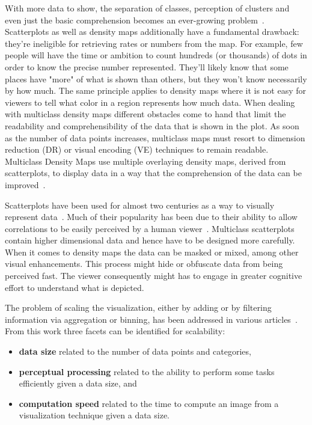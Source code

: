 With more data to show, the separation of classes, perception of clusters and even just the basic comprehension becomes an ever-growing problem~\cite{jo2019declarative}. Scatterplots as well as density maps additionally have a fundamental drawback: they're ineligible for retrieving rates or numbers from the map. For example, few people will have the time or ambition to count hundreds (or thousands) of dots in order to know the precise number represented. They'll likely know that some places have "more" of what is shown than others, but they won't know necessarily by how much. The same principle applies to density maps where it is not easy for viewers to tell what color in a region represents how much data.
When dealing with multiclass density maps different obstacles come to hand that limit the readability and comprehensibility of the data that is shown in the plot.
As soon as the number of data points increases, multiclass maps must resort to dimension reduction (DR) or visual encoding (VE) techniques to remain readable. Multiclass Density Maps use multiple overlaying density maps, derived from scatterplots, to display data in a way that the comprehension of the data can be improved~\cite{jo2019declarative}.

Scatterplots have been used for almost two centuries as a way to visually represent data~\cite{friendly2005early}. Much of their popularity has been due to their ability to allow correlations to be easily perceived by a human viewer~\cite{cleveland1993visualizing, harris2000information}. Multiclass scatterplots contain higher dimensional data and hence have to be designed more carefully.
When it comes to density maps the data can be masked or mixed, among other visual enhancements. This process might hide or obfuscate data from being perceived fast. The viewer consequently might has to engage in greater cognitive effort to understand what is depicted.

The problem of scaling the visualization, either by adding or by filtering information via aggregation or binning, has been addressed in various articles~\cite{cottam2013overplotting, cottam2014abstract, mayorga2013splatterplots, wickham2013bin}. From this work three facets can be identified for scalability:

\begin{itemize}[leftmargin=*]
	\setlength\itemsep{0.1em}
	\item \textbf{data size} related to the number of data points and categories,
	\item \textbf{perceptual processing} related to the ability to perform some tasks efficiently given a data size, and
	\item \textbf{computation speed} related to the time to compute an image from a visualization technique given a data size.
\end{itemize}

